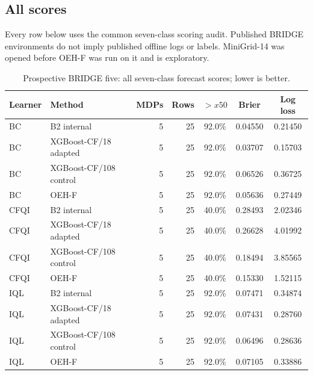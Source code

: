 \subsection{All scores}
Every row below uses the common seven-class scoring audit. Published BRIDGE environments do not imply published offline logs or labels. MiniGrid-14 was opened before OEH-F was run on it and is exploratory.
\begin{table}[t]
\centering\small
\caption{Prospective BRIDGE five: all seven-class forecast scores; lower is better.}
\begin{tabular}{llrrccc}
\toprule
Learner & Method & MDPs & Rows & $>x50$ & Brier & Log loss\\
\midrule
BC & B2 internal & 5 & 25 & 92.0\% & 0.04550 & 0.21450\\
BC & XGBoost-CF/18 adapted & 5 & 25 & 92.0\% & 0.03707 & 0.15703\\
BC & XGBoost-CF/108 control & 5 & 25 & 92.0\% & 0.06526 & 0.36725\\
BC & OEH-F & 5 & 25 & 92.0\% & 0.05636 & 0.27449\\
CFQI & B2 internal & 5 & 25 & 40.0\% & 0.28493 & 2.02346\\
CFQI & XGBoost-CF/18 adapted & 5 & 25 & 40.0\% & 0.26628 & 4.01992\\
CFQI & XGBoost-CF/108 control & 5 & 25 & 40.0\% & 0.18494 & 3.85565\\
CFQI & OEH-F & 5 & 25 & 40.0\% & 0.15330 & 1.52115\\
IQL & B2 internal & 5 & 25 & 92.0\% & 0.07471 & 0.34874\\
IQL & XGBoost-CF/18 adapted & 5 & 25 & 92.0\% & 0.07431 & 0.28760\\
IQL & XGBoost-CF/108 control & 5 & 25 & 92.0\% & 0.06496 & 0.28636\\
IQL & OEH-F & 5 & 25 & 92.0\% & 0.07105 & 0.33886\\
\bottomrule
\end{tabular}
\end{table}
